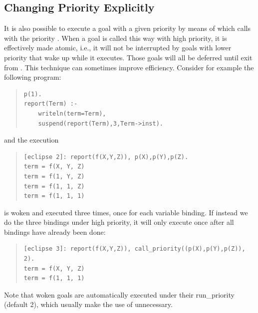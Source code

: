 \subsection{Changing Priority Explicitly}
It is also possible to execute a goal with a given priority
by means of
which calls  with the priority .
When a goal is called this way with high priority, it is effectively
made atomic, i.e., it will not be interrupted by goals with lower priority
that wake up while it executes.
Those goals will all be deferred until exit from
.
This technique can sometimes improve efficiency.
Consider for example the following program:
\begin{quote}
\begin{verbatim}
p(1).
report(Term) :-
    writeln(term=Term),
    suspend(report(Term),3,Term->inst).
\end{verbatim}
\end{quote}
and the execution
\begin{quote}
\begin{verbatim}
[eclipse 2]: report(f(X,Y,Z)), p(X),p(Y),p(Z).
term = f(X, Y, Z)
term = f(1, Y, Z)
term = f(1, 1, Z)
term = f(1, 1, 1)
\end{verbatim}
\end{quote}
 is woken and executed three times, once for each variable
binding.
If instead we do the three bindings under high priority, it will only
execute once after all bindings have already been done:
\begin{quote}
\begin{verbatim}
[eclipse 3]: report(f(X,Y,Z)), call_priority((p(X),p(Y),p(Z)), 2).
term = f(X, Y, Z)
term = f(1, 1, 1)
\end{verbatim}
\end{quote}

Note that woken goals are automatically executed under their run_priority
(default 2), which usually make the use of
unnecessary.


